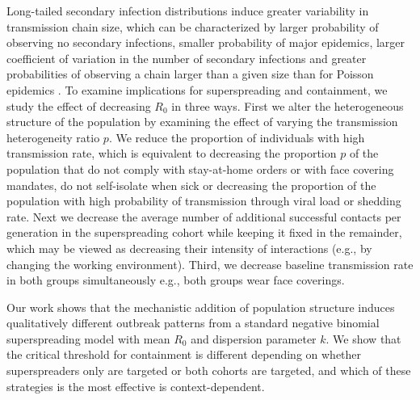 \documentclass{imammb}
\numberwithin{equation}{section}
\begin{document}
 
Long-tailed secondary infection distributions induce greater variability in transmission chain size, which can be characterized by larger probability of observing no secondary infections, smaller probability of major epidemics, larger coefficient of variation in the number of secondary infections and greater probabilities of observing a chain larger than a given size than for Poisson epidemics \citep{Althouse2020-dn}. To examine implications for superspreading and containment, we study the effect of decreasing $R_0$ in three ways. First we alter the heterogeneous structure of the population by examining the effect of varying the transmission heterogeneity ratio $p$. We reduce the proportion of individuals with high transmission rate, which is equivalent to decreasing the proportion $p$ of the population that do not comply with stay-at-home orders or with face covering mandates, do not self-isolate when sick or decreasing the proportion of the population with high probability of transmission through viral load or shedding rate. Next we decrease the average number of additional successful contacts per generation in the superspreading cohort while keeping it fixed in the remainder, which may be viewed as decreasing their intensity of interactions (e.g., by changing the working environment). Third, we decrease baseline transmission rate in both groups simultaneously e.g., both groups wear face coverings. %
 

Our work shows that the mechanistic addition of population structure induces qualitatively different outbreak patterns from a standard negative binomial superspreading model with mean $R_0$ and dispersion parameter $k$. We show that the critical threshold for containment is different depending on whether superspreaders only are targeted or both cohorts are targeted, and which of these strategies is the most effective is context-dependent. 
\end{document}
